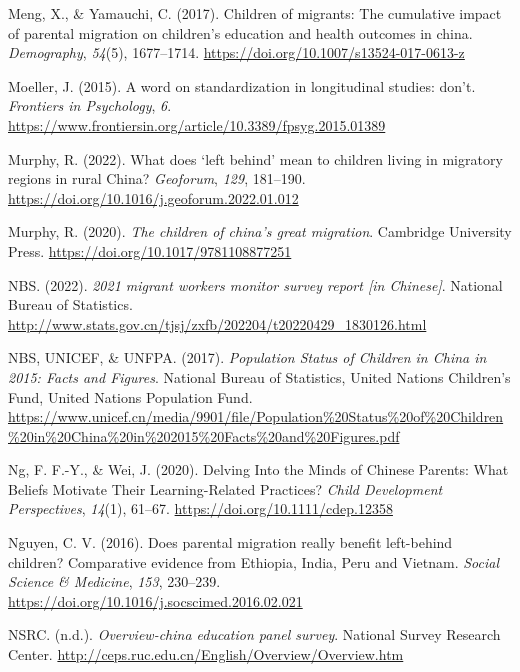\documentclass[
  man,floatsintext]{apa7}
\newlength{\cslhangindent}
\newlength{\cslentryspacingunit} %
\newenvironment{CSLReferences}[2] %
 {%
  \setlength{\parindent}{0pt}
  \ifodd #1
  \let\oldpar\par
  \def\par{\hangindent=\cslhangindent\oldpar}
  \fi
  \setlength{\parskip}{#2\cslentryspacingunit}
 }%
 {}
\begin{document}
\begin{CSLReferences}{1}{0}
\leavevmode{}%
Meng, X., \& Yamauchi, C. (2017). Children of migrants: The cumulative impact of parental migration on children{'}s education and health outcomes in china. \emph{Demography}, \emph{54}(5), 1677--1714. \url{https://doi.org/10.1007/s13524-017-0613-z}

\leavevmode{}%
Moeller, J. (2015). A word on standardization in longitudinal studies: don't. \emph{Frontiers in Psychology}, \emph{6}. \url{https://www.frontiersin.org/article/10.3389/fpsyg.2015.01389}

\leavevmode{}%
Murphy, R. (2022). What does {`}left behind{'} mean to children living in migratory regions in rural China? \emph{Geoforum}, \emph{129}, 181--190. \url{https://doi.org/10.1016/j.geoforum.2022.01.012}

\leavevmode{}%
Murphy, R. (2020). \emph{The children of china{'}s great migration}. Cambridge University Press. \url{https://doi.org/10.1017/9781108877251}

\leavevmode{}%
NBS. (2022). \emph{2021 migrant workers monitor survey report {[}in Chinese{]}}. National Bureau of Statistics. \url{http://www.stats.gov.cn/tjsj/zxfb/202204/t20220429_1830126.html}

\leavevmode{}%
NBS, UNICEF, \& UNFPA. (2017). \emph{Population Status of Children in China in 2015: Facts and Figures}. National Bureau of Statistics, United Nations Children's Fund, United Nations Population Fund. \url{https://www.unicef.cn/media/9901/file/Population\%20Status\%20of\%20Children\%20in\%20China\%20in\%202015\%20Facts\%20and\%20Figures.pdf}

\leavevmode{}%
Ng, F. F.-Y., \& Wei, J. (2020). Delving Into the Minds of Chinese Parents: What Beliefs Motivate Their Learning-Related Practices? \emph{Child Development Perspectives}, \emph{14}(1), 61--67. \url{https://doi.org/10.1111/cdep.12358}

\leavevmode{}%
Nguyen, C. V. (2016). Does parental migration really benefit left-behind children? Comparative evidence from Ethiopia, India, Peru and Vietnam. \emph{Social Science \& Medicine}, \emph{153}, 230--239. \url{https://doi.org/10.1016/j.socscimed.2016.02.021}

\leavevmode{}%
NSRC. (n.d.). \emph{Overview-china education panel survey}. National Survey Research Center. \url{http://ceps.ruc.edu.cn/English/Overview/Overview.htm}


\end{CSLReferences}
\end{document}
